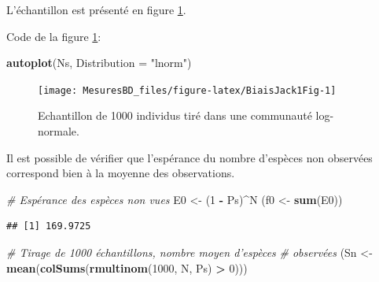 \documentclass[
  11pt,
  french,
  a4paper,
  extrafontsizes,onecolumn,openright
  ]{memoir}
\newenvironment{Shaded}{\begin{snugshade}}{\end{snugshade}}
\newcommand{\CommentTok}[1]{\textcolor[rgb]{0.56,0.35,0.01}{\textit{#1}}}
\newcommand{\DataTypeTok}[1]{\textcolor[rgb]{0.13,0.29,0.53}{#1}}
\newcommand{\DecValTok}[1]{\textcolor[rgb]{0.00,0.00,0.81}{#1}}
\newcommand{\KeywordTok}[1]{\textcolor[rgb]{0.13,0.29,0.53}{\textbf{#1}}}
\newcommand{\NormalTok}[1]{#1}
\newcommand{\OperatorTok}[1]{\textcolor[rgb]{0.81,0.36,0.00}{\textbf{#1}}}
\newcommand{\StringTok}[1]{\textcolor[rgb]{0.31,0.60,0.02}{#1}}
\begin{document}
\normalsize

L'échantillon est présenté en figure \ref{fig:BiaisJack1Fig}.

Code de la figure \ref{fig:BiaisJack1Fig}:

\scriptsize

\begin{Shaded}
\begin{Highlighting}[]
\KeywordTok{autoplot}\NormalTok{(Ns, }\DataTypeTok{Distribution =} \StringTok{"lnorm"}\NormalTok{)}
\end{Highlighting}
\end{Shaded}

\normalsize

\scriptsize

\begin{figure}

{\centering \texttt{[image: MesuresBD\_files/figure-latex/BiaisJack1Fig-1]} 

}

\caption{Echantillon de 1000 individus tiré dans une communauté log-normale.}\label{fig:BiaisJack1Fig}
\end{figure}

\normalsize

Il est possible de vérifier que l'espérance du nombre d'espèces non observées correspond bien à la moyenne des observations.

\scriptsize

\begin{Shaded}
\begin{Highlighting}[]
\CommentTok{# Espérance des espèces non vues}
\NormalTok{E0 <-}\StringTok{ }\NormalTok{(}\DecValTok{1} \OperatorTok{-}\StringTok{ }\NormalTok{Ps)}\OperatorTok{^}\NormalTok{N}
\NormalTok{(f0 <-}\StringTok{ }\KeywordTok{sum}\NormalTok{(E0))}
\end{Highlighting}
\end{Shaded}

\begin{verbatim}
## [1] 169.9725
\end{verbatim}

\begin{Shaded}
\begin{Highlighting}[]
\CommentTok{# Tirage de 1000 échantillons, nombre moyen d'espèces}
\CommentTok{# observées}
\NormalTok{(Sn <-}\StringTok{ }\KeywordTok{mean}\NormalTok{(}\KeywordTok{colSums}\NormalTok{(}\KeywordTok{rmultinom}\NormalTok{(}\DecValTok{1000}\NormalTok{, N, Ps) }\OperatorTok{>}\StringTok{ }\DecValTok{0}\NormalTok{)))}
\end{Highlighting}
\end{Shaded}
\end{document}
